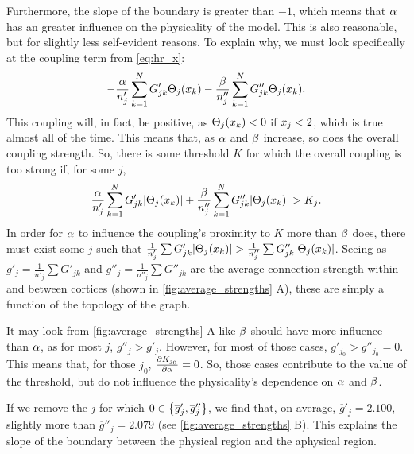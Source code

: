 Furthermore, the slope of the boundary is greater than $-1$, which means that $\alpha$ has an greater influence on the physicality of the model.
This is also reasonable, but for slightly less self-evident reasons.
To explain why, we must look specifically at the coupling term from \cref{eq:hr_x}:
\[
  -\frac{\hra}{n'_{j}} \sum_{k = 1}^{N} G'_{j k} \Theta_{j}\pqty{\hrx_{k}}
  -
  \frac{\hrb}{n''_{j}} \sum_{k = 1}^{N} G''_{j k} \Theta_{j}\pqty{\hrx_{k}}.
\]
This coupling will, in fact, be positive, as $\Theta_{j}\pqty{\hrx_{k}} < 0$ if $x_{j} < 2$, which is true almost all of the time.
This means that, as $\alpha$ and $\beta$ increase, so does the overall coupling strength.
So, there is some threshold $K$ for which the overall coupling is too strong if, for some $j$,
\begin{equation}
  \label{eq:coupling_inequality}
  \frac{\hra}{n'_{j}} \sum_{k = 1}^{N} G'_{j k} \abs{\Theta_{j}\pqty{\hrx_{k}}}
  +
  \frac{\hrb}{n''_{j}} \sum_{k = 1}^{N} G''_{j k} \abs{\Theta_{j}\pqty{\hrx_{k}}}
  >
  K_{j}.
\end{equation}
In order for $\alpha$ to influence the coupling's proximity to $K$ more than $\beta$ does, there must exist some $j$ such that
$\frac{1}{n'_{j}} \sum G'_{j k} \abs{\Theta_{j}\pqty{\hrx_{k}}}
>
\frac{1}{n''_{j}} \sum G''_{j k} \abs{\Theta_{j}\pqty{\hrx_{k}}}$.
Seeing as $\overline{g}'_{j} = \frac{1}{n'_{j}} \sum G'_{j k}$ and $\overline{g}''_{j} = \frac{1}{n''_{j}} \sum G''_{j k}$ are the average connection strength within and between cortices (shown in \cref{fig:average_strengths} A), these are simply a function of the topology of the graph.

It may look from \cref{fig:average_strengths} A like $\beta$ should have more influence than $\alpha$, as for most $j$, $\overline{g}''_{j} > \overline{g}'_{j}$.
However, for most of those cases, $\overline{g}'_{j_{0}} > \overline{g}''_{j_{0}} = 0$.
This means that, for those $j_{0}$, $\pdv{K_{j_{0}}}{\alpha} = 0$.
So, those cases contribute to the value of the threshold, but do not influence the physicality's dependence on $\alpha$ and $\beta$.

If we remove the $j$ for which $0 \in \Bqty{\overline{g}'_{j}, \overline{g}''_{j}}$, we find that, on average, $\overline{g}'_{j} = 2.100$, slightly more than $\overline{g}''_{j} = 2.079$ (see \cref{fig:average_strengths} B).
This explains the slope of the boundary between the physical region and the aphysical region.

